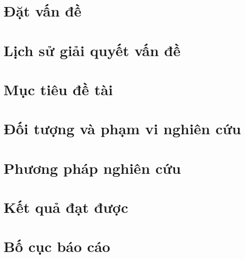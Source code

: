 \documentclass[../thesis.tex]{subfiles}
\begin{document}
\section{Đặt vấn đề}

\section{Lịch sử giải quyết vấn đề}

\section{Mục tiêu đề tài}

\section{Đối tượng và phạm vi nghiên cứu}

\section{Phương pháp nghiên cứu}

\section{Kết quả đạt được}

\section{Bố cục báo cáo}
\end{document}
